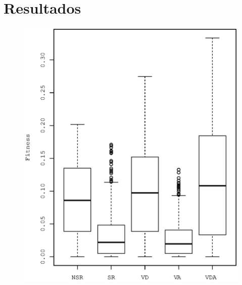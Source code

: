 \chapter{Resultados}
\label{resultados}

\begin{figure}[h]
    \centering
    \begin{minipage}{.4\textwidth}
        \includegraphics[width=\textwidth]{figures/reeval-nsr}
        \label{fig:reeval-nsr}
    \end{minipage}%
    \quad
    \begin{minipage}{.4\textwidth}

\end{minipage}
\end{figure}

